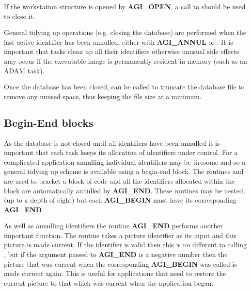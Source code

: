 \documentclass[twoside,11pt,nolof]{starlink}
\begin{document}
If the workstation structure is opened by \textbf{AGI\_OPEN}, a call to
 should be used to close it.

General tidying up operations (e.g. closing the database) are performed
when the last active identifier has been annulled, either with
\textbf{AGI\_ANNUL} or
. It is important that tasks clean
up all their identifiers otherwise unusual side effects may occur if
the executable image is permanently resident in memory (such as an
ADAM task).

Once the database has been closed,  can
be called to truncate the database file to remove any unused space, thus
keeping the file size at a minimum.

\subsection{Begin-End blocks\label{bend}}
As the database is not closed until all identifiers have been annulled
it is important that each task keeps its allocation of identifiers
under control. For a complicated application annulling individual
identifiers may be tiresome and so a general tidying up scheme is
available using a begin-end block. The routines
 and
are used to bracket a block of code and all the
identifiers allocated within the block are automatically annulled
by \textbf{AGI\_END}. These routines may be nested, (up to a depth of eight)
but each \textbf{AGI\_BEGIN} must have its corresponding \textbf{AGI\_END}.

As well as annulling identifiers the routine \textbf{AGI\_END} performs another
important function. The routine takes a picture identifier as its input
and this picture is made current. If the identifier is valid then this is
no different to calling ,
but if the argument passed to
\textbf{AGI\_END} is a negative number then the picture that was current when
the corresponding \textbf{AGI\_BEGIN} was called is made current again. This
is useful for applications that need to restore the current picture to
that which was current when the application began.
\end{document}
